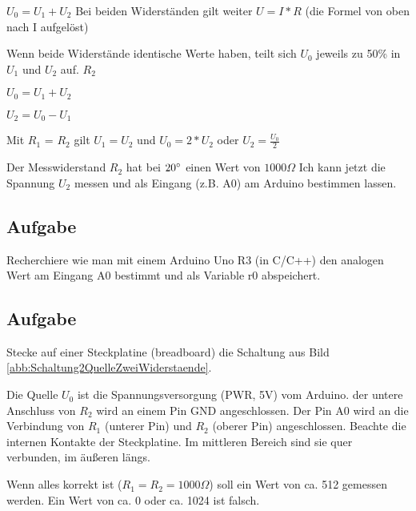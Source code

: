 \documentclass[paper = a4]{scrartcl}
\begin{document}
$U_0 = U_1 + U_2$ Bei beiden Widerständen gilt weiter $U = I * R$ (die Formel von oben nach I aufgelöst)

Wenn beide Widerstände identische Werte haben, teilt sich $U_0$ jeweils zu 50\% in $U_1$ und $U_2$ auf. $R_2$

$U_0 = U_1 + U_2$

$U_2 = U_0 - U_1$

Mit $R_1$ = $R_2$ gilt $U_1 = U_2$ und $U_0 = 2 * U_2$ oder $U_2 = \frac{U_0}{2}$

Der Messwiderstand $R_2$ hat bei $20\degree$ einen Wert von $1000 \Omega$ Ich kann jetzt die Spannung $U_2$ messen und als Eingang (z.B. A0) am Arduino bestimmen lassen.
\subsection{Aufgabe}
Recherchiere wie man mit einem Arduino Uno R3 (in C/C++) den analogen Wert am Eingang A0 bestimmt und als Variable r0 abspeichert.

\subsection{Aufgabe}
Stecke auf einer Steckplatine (breadboard) die Schaltung aus Bild \ref{abb:Schaltung2QuelleZweiWiderstaende}.

Die Quelle $U_0$ ist die Spannungsversorgung (PWR, 5V) vom Arduino. der untere Anschluss von $R_2$ wird an einem Pin GND angeschlossen. Der Pin A0 wird an die Verbindung von $R_1$ (unterer Pin) und $R_2$ (oberer Pin) angeschlossen. Beachte die internen Kontakte der Steckplatine. Im mittleren Bereich sind sie quer verbunden, im äußeren längs.

Wenn alles korrekt ist ($R_1 = R_2 = 1000 \Omega$) soll ein Wert von ca. 512 gemessen werden. Ein Wert von ca. 0 oder ca. 1024 ist falsch.
\end{document}
